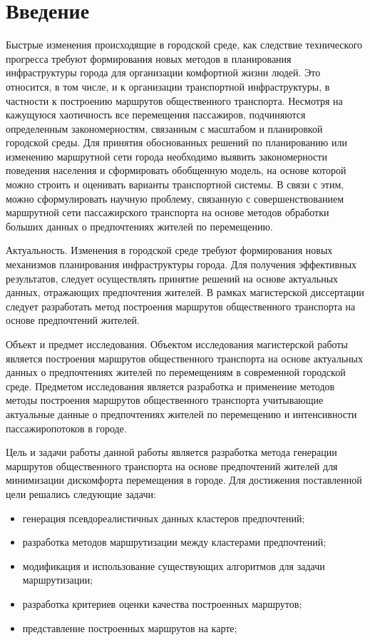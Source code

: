 \part{Введение}
Быстрые изменения происходящие в городской среде, как следствие технического прогресса требуют формирования 
новых методов в планирования инфраструктуры города для организации комфортной жизни людей. Это относится, в 
том числе, и к организации транспортной инфраструктуры, в частности к построению маршрутов общественного 
транспорта. Несмотря на кажущуюся хаотичность все перемещения пассажиров, подчиняются определенным 
закономерностям, связанным с масштабом и планировкой городской среды. Для принятия обоснованных решений по 
планированию или изменению маршрутной сети города необходимо выявить закономерности поведения населения и 
сформировать обобщенную модель, на основе которой можно строить и оценивать варианты транспортной системы. 
В связи с этим, можно сформулировать научную проблему, связанную с совершенствованием маршрутной сети 
пассажирского транспорта на основе методов обработки больших данных о предпочтениях жителей по перемещению. 

Актуальность. Изменения в городской среде требуют формирования новых механизмов планирования 
инфраструктуры города. Для получения эффективных результатов, следует осуществлять принятие решений на основе 
актуальных данных, отражающих предпочтения жителей. В рамках магистерской диссертации следует разработать 
метод построения маршрутов общественного транспорта на основе предпочтений жителей.

Объект и предмет исследования. Объектом исследования магистерской работы является построения маршрутов 
общественного транспорта на основе актуальных данных о предпочтениях жителей по перемещениям в современной 
городской среде. Предметом исследования является разработка и применение методов методы построения маршрутов 
общественного транспорта учитывающие актуальные данные о предпочтениях жителей по перемещению и интенсивности 
пассажиропотоков в городе.

Цель и задачи работы данной работы является разработка метода генерации маршрутов общественного 
транспорта на основе предпочтений жителей для минимизации дискомфорта перемещения в городе. Для достижения 
поставленной цели решались следующие задачи:
\begin{itemize}
    \item генерация псевдореалистичных данных кластеров предпочтений;
    \item разработка методов маршрутизации между кластерами предпочтений;
    \item модификация и использование существующих алгоритмов для задачи маршрутизации;
    \item разработка критериев оценки качества построенных маршрутов;
    \item представление построенных маршрутов на карте;
\end{itemize}

